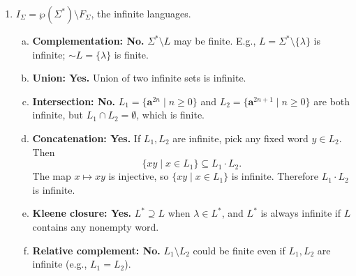 \begin{enumerate}[{5.}1. ]
\begin{enumerate}[(a)]
  If $|\Sigma|\ge 2$, then $B_\Sigma$ is \emph{not} closed under concatenation.
  For example, let $L_1=\{\pmb{a}\}$ and
  $L_2=\Sigma^*\setminus\{\pmb{aa}\}$.  Then $L_1\in F_\Sigma$ and
  $L_2\in C_\Sigma$, but
  \[
  L_1\cdot L_2=\{\pmb{a}w\mid w\neq \pmb{aa}\},
  \]
  the set of all words beginning with $\pmb{a}$ except $\pmb{aaa}$.  This
  language is infinite, and its complement is also infinite, so it is neither
  finite nor cofinite.

  Therefore the correct answer is:
  \[
  |\Sigma|=1 \Rightarrow \text{closed},\qquad |\Sigma|\ge 2 \Rightarrow \text{not closed}.
  \]
  \item \textbf{Kleene closure: No.}  Pick any symbol $\pmb{a}\in\Sigma$ and let
  $L=\{\pmb{aa}\}$.  Then $L\in F_\Sigma\subseteq B_\Sigma$, but
  \[
  L^*=\{(\pmb{aa})^n\mid n\ge 0\}.
  \]
  This language is infinite.  If $|\Sigma|=1$, its complement is the set of
  odd-length words, which is infinite.  If $|\Sigma|\ge 2$, its complement
  contains every word with some symbol other than $\pmb{a}$, so it is again
  infinite.  Thus $L^*$ is neither finite nor cofinite, so $B_\Sigma$ is not
  closed under Kleene closure.
  \item \textbf{Relative complement: Yes.}  If $L_1\in C_\Sigma$ and
  $L_2\in C_\Sigma$, then $L_1\setminus L_2=L_1\cap\sim L_2$ where
  $\sim L_2$ is finite, so the result is finite and therefore belongs to
  $F_\Sigma\subseteq B_\Sigma$.  If $L_1\in F_\Sigma$, then
  $L_1\setminus L_2\subseteq L_1$ is finite.  Hence $B_\Sigma$ is closed under
  relative complement.
\end{enumerate}

\item $I_\Sigma=\wp(\Sigma^*)\setminus F_\Sigma$, the infinite languages.

\begin{enumerate}[(a)]
  \item \textbf{Complementation: No.}  $\Sigma^*\setminus L$ may be finite.  E.g., $L=\Sigma^*\setminus\{\lambda\}$ is infinite; $\sim L=\{\lambda\}$ is finite.
  \item \textbf{Union: Yes.}  Union of two infinite sets is infinite.
  \item \textbf{Intersection: No.}  $L_1=\{\pmb{a}^{2n}\mid n\ge 0\}$ and $L_2=\{\pmb{a}^{2n+1}\mid n\ge 0\}$ are both infinite, but $L_1\cap L_2=\emptyset$, which is finite.
  \item \textbf{Concatenation: Yes.}  If $L_1,L_2$ are infinite, pick any fixed
  word $y\in L_2$.  Then
  \[
  \{xy\mid x\in L_1\}\subseteq L_1\cdot L_2.
  \]
  The map $x\mapsto xy$ is injective, so $\{xy\mid x\in L_1\}$ is infinite.
  Therefore $L_1\cdot L_2$ is infinite.
  \item \textbf{Kleene closure: Yes.}  $L^*\supseteq L$ when $\lambda\in L^*$, and $L^*$ is always infinite if $L$ contains any nonempty word.
  \item \textbf{Relative complement: No.}  $L_1\setminus L_2$ could be finite even if $L_1,L_2$ are infinite (e.g., $L_1=L_2$).
\end{enumerate}


\end{enumerate}
